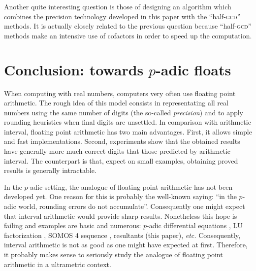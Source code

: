 \documentclass{article}
\begin{document}
Another quite interesting question is those of designing an algorithm 
which combines the precision technology developed in this paper with the 
``half-\textsc{gcd}'' methods. It is actually closely related to the 
previous question because ``half-\textsc{gcd}'' methods make an 
intensive use of cofactors in order to speed up the computation.

\section{Conclusion: towards $p$-adic floats}

When computing with real numbers, computers very often use floating 
point arithmetic. 
The rough idea of this model consists in representating all real numbers 
using the same number of digits (the so-called \emph{precision}) and to
apply rounding heuristics when final digits are unsettled.
In comparison with arithmetic interval, floating point arithmetic has
two main advantages. First, it allows simple and fast implementations.
Second, experiments show that the obtained results have generally
more much correct digits that those predicted by arithmetic interval.
The counterpart is that, expect on small examples, obtaining proved
results is generally intractable.

In the $p$-adic setting, the analogue of floating point arithmetic has 
not been developed yet. One reason for this is probably the well-known 
saying: ``in the $p$-adic world, rounding errors do not accumulate''. 
Consequently one might expect that interval arithmetic would provide 
sharp results. Nonetheless this hope is failing and examples are basic 
and numerous: $p$-adic differential equations \cite{bostan, padicdiff}, 
LU factorization \cite{LU}, SOMOS 4 sequence \cite{padicprec}, 
resultants (this paper), \emph{etc.} Consequently, interval arithmetic 
is not as good as one might have expected at first. Therefore, it 
probably makes sense to seriously study the analogue of floating point 
arithmetic in a ultrametric context.
\end{document}
